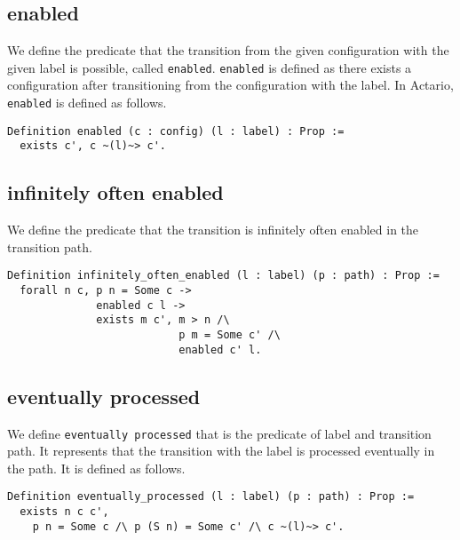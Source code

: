 \subsection{enabled}
We define the predicate that the transition from the given configuration with the given label is possible, called \texttt{enabled}.
\texttt{enabled} is defined as there exists a configuration after transitioning from the configuration with the label.
In Actario, \texttt{enabled} is defined as follows.

\begin{lstlisting}
Definition enabled (c : config) (l : label) : Prop :=
  exists c', c ~(l)~> c'.
\end{lstlisting}

\subsection{infinitely often enabled}
We define the predicate that the transition is infinitely often enabled in the transition path.

\begin{lstlisting}
Definition infinitely_often_enabled (l : label) (p : path) : Prop :=
  forall n c, p n = Some c ->
              enabled c l ->
              exists m c', m > n /\
                           p m = Some c' /\
                           enabled c' l.
\end{lstlisting}


\subsection{eventually processed}
We define \texttt{eventually processed} that is the predicate of label and transition path.
It represents that the transition with the label is processed eventually in the path.
It is defined as follows.

\begin{lstlisting}
Definition eventually_processed (l : label) (p : path) : Prop :=
  exists n c c',
    p n = Some c /\ p (S n) = Some c' /\ c ~(l)~> c'.
\end{lstlisting}



